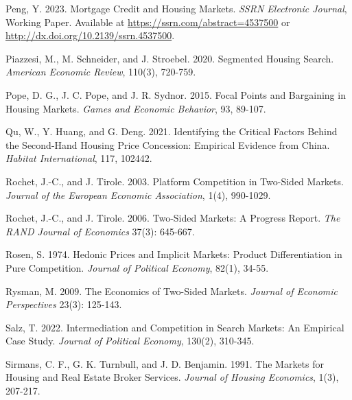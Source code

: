 \documentclass[11pt]{article}
\begin{document}
\begin{singlespace}
\begin{thebibliography}{}
Peng, Y. 2023. Mortgage Credit and Housing Markets. \textit{SSRN Electronic Journal}, Working Paper. Available at \url{https://ssrn.com/abstract=4537500} or \url{http://dx.doi.org/10.2139/ssrn.4537500}. 

Piazzesi, M., M. Schneider, and J. Stroebel. 2020. Segmented Housing Search. \textit{American Economic Review}, 110(3), 720-759. 

Pope, D. G., J. C. Pope, and J. R. Sydnor. 2015. Focal Points and Bargaining in Housing Markets. \textit{Games and Economic Behavior}, 93, 89-107. 

Qu, W., Y. Huang, and G. Deng. 2021. Identifying the Critical Factors Behind the Second-Hand Housing Price Concession: Empirical Evidence from China. \textit{Habitat International}, 117, 102442. 

Rochet, J.-C., and J. Tirole. 2003. Platform Competition in Two-Sided Markets. \textit{Journal of the European Economic Association}, 1(4), 990-1029. 

Rochet, J.-C., and J. Tirole. 2006. Two-Sided Markets: A Progress Report. \textit{The RAND Journal of Economics} 37(3): 645-667. %

Rosen, S. 1974. Hedonic Prices and Implicit Markets: Product Differentiation in Pure Competition. \textit{Journal of Political Economy}, 82(1), 34-55.%

Rysman, M. 2009. The Economics of Two-Sided Markets. \textit{Journal of Economic Perspectives} 23(3): 125-143. %

Salz, T. 2022. Intermediation and Competition in Search Markets: An Empirical Case Study. \textit{Journal of Political Economy}, 130(2), 310-345. 

Sirmans, C. F., G. K. Turnbull, and J. D. Benjamin. 1991. The Markets for Housing and Real Estate Broker Services. \textit{Journal of Housing Economics}, 1(3), 207-217. 


\end{thebibliography}
\end{singlespace}
\end{document}
